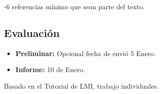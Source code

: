 \documentclass[10pt,a4paper]{article}
\begin{document}
-6 referencias mínimo que sean parte del texto.


%
%
%
%
%
%
%

\subsection{Evaluación}

\begin{itemize}
	\item \textbf{Preliminar:} Opcional fecha de envió 5 Enero. 
	\item \textbf{Informe:} 10 de Enero. 
\end{itemize}

Basado en el Tutorial de LMI, trabajo individuales. 
\end{document}
